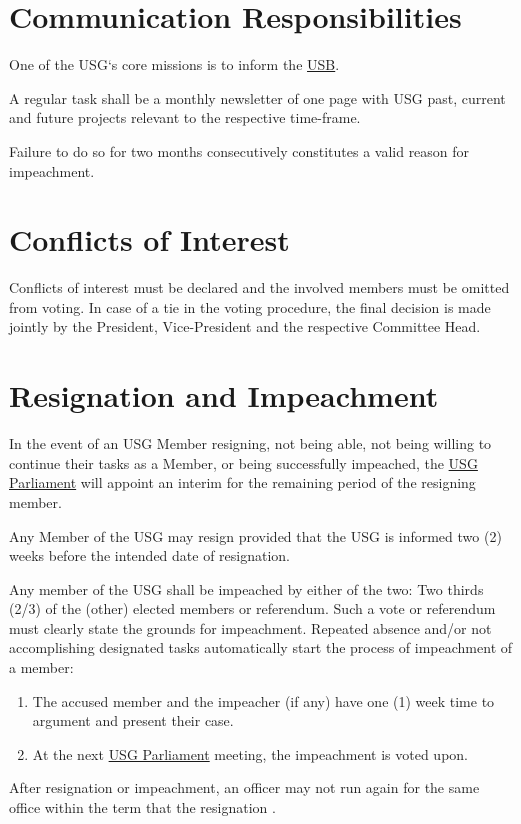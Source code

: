 {	\protect\section{Communication Responsibilities}
	One of the USG`s core missions is to inform the \hyperref[studentbody]{USB}. 
	\protect\begin{parenum}
		\item A regular task shall be a \protect{}monthly newsletter of one page with USG past, current and future projects relevant to the respective time-frame.
		\item Failure to do so for two months consecutively constitutes a valid reason for impeachment.
	\end{parenum}
	
	\protect\section{Conflicts of Interest}
	Conflicts of interest must be declared and the involved members must be omitted from voting. In case of a tie in the voting procedure, the final decision is made jointly by the President, Vice-President and the respective Committee Head.
	
	
	
	\protect\section{Resignation and Impeachment}
	In the event of an USG Member resigning, not being able, not being willing to continue their tasks as a Member, or being successfully impeached, the \hyperref[USGParliamentDef]{USG Parliament} will appoint an interim for the remaining period of the resigning member.
	
	\protect\begin{parenum}
		\item Any Member of the USG may resign provided that the USG is informed two (2) weeks before the intended date of resignation.
		
		\item Any member of the USG shall be impeached by either of the two: Two thirds (2/3) of the (other) elected members or referendum. Such a vote or referendum must clearly state the grounds for impeachment. Repeated absence  and/or not accomplishing designated tasks automatically start the process of impeachment of a member:
		\begin{enumerate}
			\item The accused member and the impeacher (if any) have one (1) week time to argument and present their case.
			\item At the next \hyperref[USGParliamentDef]{USG Parliament} meeting, the impeachment is voted upon.
		\end{enumerate}
		
		\item After resignation or impeachment, an officer may not run again for the same office within the term that the resignation \add[P]{or impeachment took place}.
	\end{parenum}




}